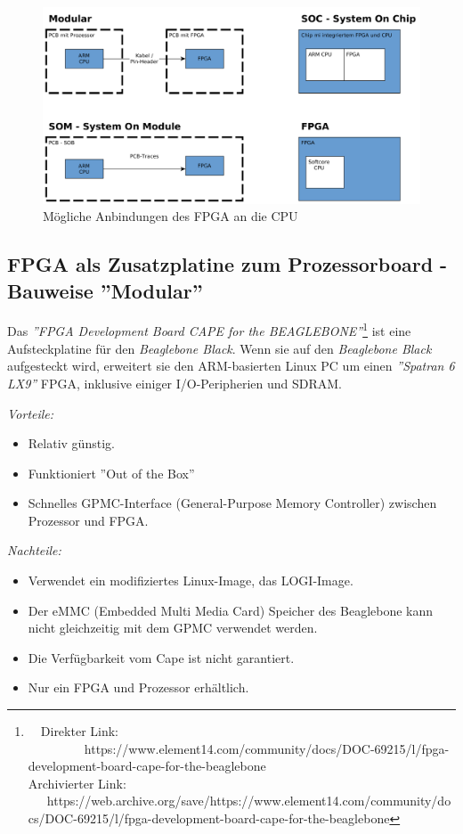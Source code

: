\begin{figure}[htbp]
	\centering
		\includegraphics[width=\textwidth,height=\textheight,keepaspectratio]{graphs/bauformen.png}
	\caption[]{Mögliche Anbindungen des FPGA an die CPU}
	\label{fig:anbindungFPG}
\end{figure}

\subsection{FPGA als Zusatzplatine zum Prozessorboard - Bauweise ''Modular''}
Das \textit{''FPGA Development Board CAPE for the BEAGLEBONE''}\footnote{\ \ Direkter Link: \ \ \ \ \ \ \ \ \ https://www.element14.com/community/docs/DOC-69215/l/fpga-development-board-cape-for-the-beaglebone\\ Archivierter Link: \ \ \ https://web.archive.org/save/https://www.element14.com/community/docs/DOC-69215/l/fpga-development-board-cape-for-the-beaglebone}  ist eine Aufsteckplatine für den \textit{Beaglebone Black}.
Wenn sie auf den \textit{Beaglebone Black} aufgesteckt wird, erweitert sie den ARM-basierten Linux PC um einen \textit{''Spatran 6 LX9''} FPGA, inklusive einiger I/O-Peripherien und SDRAM.

\textit{Vorteile:}
\begin{itemize}
	\item Relativ günstig.
	\item Funktioniert ''Out of the Box''
	\item Schnelles GPMC-Interface (General-Purpose Memory Controller) zwischen Prozessor und FPGA.
\end{itemize}

\textit{Nachteile:}
\begin{itemize}
	\item Verwendet ein modifiziertes Linux-Image, das LOGI-Image.
	\item Der eMMC (Embedded Multi Media Card) Speicher des Beaglebone kann nicht gleichzeitig mit dem GPMC verwendet werden.
	\item Die Verfügbarkeit vom Cape ist nicht garantiert.
	\item Nur ein FPGA und Prozessor erhältlich.
\end{itemize}

